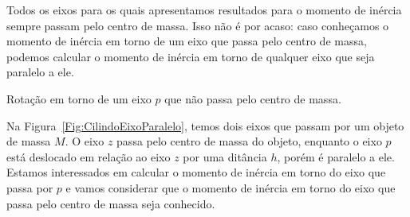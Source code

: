 Todos os eixos para os quais apresentamos resultados para o momento de inércia sempre passam pelo centro de massa. Isso não é por acaso: caso conheçamos o momento de inércia em torno de um eixo que passa pelo centro de massa, podemos calcular o momento de inércia em torno de qualquer eixo que seja paralelo a ele.

\begin{marginfigure}[1cm]
\centering
{}
\caption{Rotação em torno de um eixo $p$ que não passa pelo centro de massa. \label{Fig:CilindoEixoParalelo}}
\end{marginfigure}

Na Figura~\ref{Fig:CilindoEixoParalelo}, temos dois eixos que passam por um objeto de massa $M$. O eixo $z$ passa pelo centro de massa do objeto, enquanto o eixo $p$ está deslocado em relação ao eixo $z$ por uma ditância $h$, porém é paralelo a ele. Estamos interessados em calcular o momento de inércia em torno do eixo que passa por $p$ e vamos considerar que o momento de inércia em torno do eixo que passa pelo centro de massa seja conhecido. 


